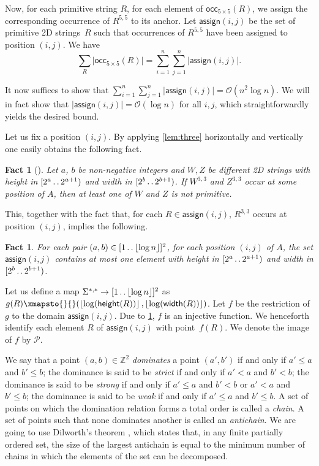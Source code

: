 \documentclass[11pt,letterpaper]{article}
\newcommand{\cO}{\mathcal{O}}
\newcommand{\floor}[1]{\left\lfloor #1 \right\rfloor}
\newcommand{\width}{\textsf{width}}
\newcommand{\height}{\textsf{height}}
\def\dd{\mathinner{.\,.}}
\newcommand{\OCR}{\textsf{occ}_{5\times 5}}
\newcommand{\assign}{\textsf{assign}}
\renewcommand{\P}{\mathcal{P}}
\newtheorem{fact}[theorem]{Fact}
\begin{document}
Now, for each primitive string $R$, for each element of $\OCR(R)$, we assign the corresponding occurrence of $R^{5,5}$ to its anchor.
Let $\assign(i,j)$ be the set of primitive 2D strings~$R$ such that occurrences of $R^{5,5}$ have been assigned to position $(i,j)$.
We have
\begin{equation}\label{eq:distr}
\sum_R|\OCR(R)|=\sum_{i=1}^{n}\sum_{j=1}^{n}|\assign(i,j)|.
\end{equation}

It now suffices to show that $\sum_{i=1}^{n}\sum_{j=1}^{n}|\assign(i,j)|=\cO(n^2 \log n)$.
We will in fact show that $|\assign(i,j)|=\cO(\log n)$ for all $i,j$, which straightforwardly yields the desired bound.

Let us fix a position $(i,j)$.
By applying \cref{lem:three} horizontally and vertically one easily obtains the following fact.

\begin{fact}[{\cite[Corollary 13]{CRRWZ}}]\label{fact:threethree}
Let $a$, $b$ be non-negative integers and $W, Z$
be different 2D strings with height in $[2^a \dd 2^{a+1})$ and width in $[2^b\dd 2^{b+1})$.
If $W^{3,3}$ and $Z^{3,3}$ occur at some position of $A$, then at least one of $W$ and $Z$
is not primitive.
\end{fact}

This, together with the fact that, for each $R \in \assign(i,j)$, $R^{3,3}$ occurs at position $(i,j)$, implies the following.

\begin{fact}\label{lem:unique}
For each pair $(a,b) \in [1 \dd \floor{\log n}]^2$, for each position $(i,j)$ of $A$, the set $\assign(i,j)$ contains at most one element with height in $[2^a \dd 2^{a+1})$ and width in $[2^b \dd 2^{b+1})$.
\end{fact}

Let us define a map $\Sigma^{*,*} \rightarrow [1 \dd \floor{\log n}]^2$ as $ g(R) \xmapsto{}{} (\floor{\log (\height(R))}, \floor{\log (\width(R))})$.
Let $f$ be the restriction of $g$ to the domain $\assign(i,j)$.
Due to \cref{lem:unique}, $f$ is an injective function.
We henceforth identify each element $R$ of $\assign(i,j)$ with point~$f(R)$.
We denote the image of $f$ by $\P$.

We say that a point $(a,b) \in \mathbb{Z}^2$ \emph{dominates} a point $(a',b')$ if and only if $a' \leq a$ and $b' \leq b$;
the dominance is said to be \emph{strict} if and only if $a' < a$ and $b' < b$;
the dominance is said to be \emph{strong} if and only if $a' \leq a$ and $b' < b$ or $a' < a$ and $b' \leq b$;
the dominance is said to be \emph{weak} if and only if $a' \leq a$ and $b' \leq b$.
A set of points on which the domination relation forms a total order is called a \emph{chain}.
A set of points such that none dominates another is called an \emph{antichain}.
We are going to use Dilworth's theorem \cite{dilworth}, which states that, in any finite partially ordered set, the size of the largest antichain is equal to the minimum number of chains in which the elements of the set can be decomposed.
\end{document}
